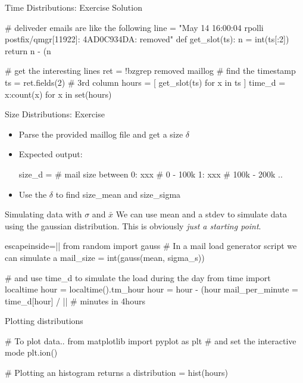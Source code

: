 \iftrue
\begin{pyframe}{Time Distributions: Exercise Solution}
\begin{pycode}
# deliveder emails are like the following
line = "May 14 16:00:04 rpolli postfix/qmgr[11922]: 4AD0C934DA: removed"
def get_slot(ts):
    n = int(ts[:2])
    return n - (n%
    
# get the interesting lines
ret = !bzgrep removed maillog
# find the timestamp
ts = ret.fields(2) # 3rd column
hours = [ get_slot(ts)  for x in ts ]
time_d = {x:count(x) for x in set(hours)}
\end{pycode}
\end{pyframe}

\fi 

\begin{pyframe}{Size Distributions: Exercise}
\begin{itemize}
\item Parse the provided maillog file and get a size $\delta$
\item Expected output: 
\begin{pycode}
size_d = {  # mail size between
    0: xxx  #  0 - 100k
    1: xxx  #  100k - 200k
    ..
    }
\end{pycode}
\item Use the $\delta$ to find size\_mean and size\_sigma
\end{itemize}
\end{pyframe}



\begin{pyframe}{Simulating data with $\sigma$ and $\bar{x}$}
We can use  mean and a stdev to simulate data using the gaussian distribution.
This is obviously \emph{just a starting point}.
\begin{pycode*}{escapeinside=||}
from random import gauss
# In a mail load generator script we can simulate a
mail_size = int(gauss(mean, sigma_s))

# and use time_d to simulate the load during the day
from time import localtime
hour = localtime().tm_hour
hour = hour - (hour %
mail_per_minute = time_d[hour] / || # minutes in 4hours
\end{pycode*}
\end{pyframe}

\begin{pyframe}{Plotting distributions}
\begin{pycode}
# To plot data..
from matplotlib import pyplot as plt
# and set the interactive mode
plt.ion()

# Plotting an histogram returns a 
distribution = hist(hours)
\end{pycode}
\end{pyframe}


